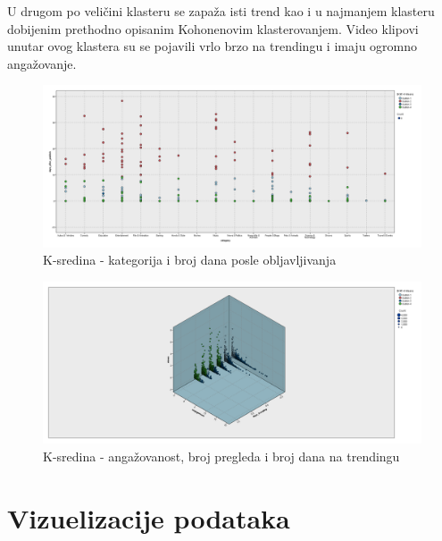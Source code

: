\documentclass[a4paper]{article}
\theoremstyle{definition}
\begin{document}
U drugom po veličini klasteru se zapaža isti trend kao i u najmanjem klasteru dobijenim prethodno opisanim Kohonenovim klasterovanjem. Video klipovi unutar ovog klastera
su se pojavili vrlo brzo na trendingu i imaju ogromno angažovanje. 



\begin{figure}[H]
\begin{center}
    \includegraphics[width=1\textwidth]{K-Means_category_days_after_publish.png}
    \caption{K-sredina -  kategorija i broj dana posle obljavljivanja}
     \label{fig:km2}
\end{center}
\end{figure}

\begin{figure}[H]
\begin{center}
    \includegraphics[width=1\textwidth]{K-Means_engagement_views_days_trending.png}
    \caption{K-sredina - angažovanost, broj pregleda i broj dana na trendingu }
     \label{fig:km3}
\end{center}
\end{figure}




\section{Vizuelizacije podataka}
\label{sec:dod}
\end{document}

